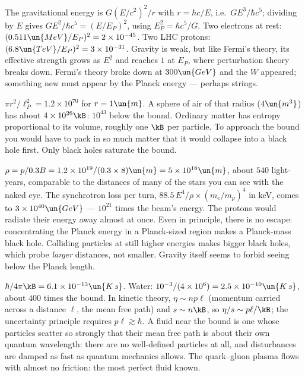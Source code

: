  The gravitational energy is $G(E/c^2)^2/r$ with $r = \hbar c/E$, i.e.\ $GE^3/\hbar c^5$; dividing by $E$ gives $GE^2/\hbar c^5 = (E/E_P)^2$, using $E_P^2 = \hbar c^5/G$. Two electrons at rest: $(0.511\un{MeV}/E_P)^2 = 2\times10^{-45}$. Two LHC protons: $(6.8\un{TeV}/E_P)^2 = 3\times10^{-31}$. Gravity is weak, but like Fermi's theory, its effective strength grows as $E^2$ and reaches $1$ at $E_P$, where perturbation theory breaks down. Fermi's theory broke down at $300\un{GeV}$ and the $W$ appeared; something new must appear by the Planck energy --- perhaps strings.

 $\pi r^2/\ell_P^2 = 1.2\times10^{70}$ for $r = 1\un{m}$. A sphere of air of that radius ($4\un{m^3}$) has about $4\times10^{26}\kB$: $10^{43}$ below the bound. Ordinary matter has entropy proportional to its volume, roughly one $\kB$ per particle. To approach the bound you would have to pack in so much matter that it would collapse into a black hole first. Only black holes saturate the bound.

 $\rho = p/0.3B = 1.2\times10^{19}/(0.3\times8)\un{m} = 5\times10^{18}\un{m}$, about $540$ light-years, comparable to the distances of many of the stars you can see with the naked eye. The synchrotron loss per turn, $88.5\,E^4/\rho\times(m_e/m_p)^4$ in keV, comes to $3\times10^{40}\un{GeV}$ --- $10^{21}$ times the beam's energy. The protons would radiate their energy away almost at once. Even in principle, there is no escape: concentrating the Planck energy in a Planck-sized region makes a Planck-mass black hole. Colliding particles at still higher energies makes bigger black holes, which probe \emph{larger} distances, not smaller. Gravity itself seems to forbid seeing below the Planck length.

 $\hbar/4\pi\kB = 6.1\times10^{-13}\un{K\,s}$. Water: $10^{-3}/(4\times10^6) = 2.5\times10^{-10}\un{K\,s}$, about $400$ times the bound. In kinetic theory, $\eta\sim np\ell$ (momentum carried across a distance $\ell$, the mean free path) and $s\sim n\kB$, so $\eta/s\sim p\ell/\kB$; the uncertainty principle requires $p\ell\gtrsim\hbar$. A fluid near the bound is one whose particles scatter so strongly that their mean free path is about their own quantum wavelength: there are no well-defined particles at all, and disturbances are damped as fast as quantum mechanics allows. The quark--gluon plasma flows with almost no friction: the most perfect fluid known.

